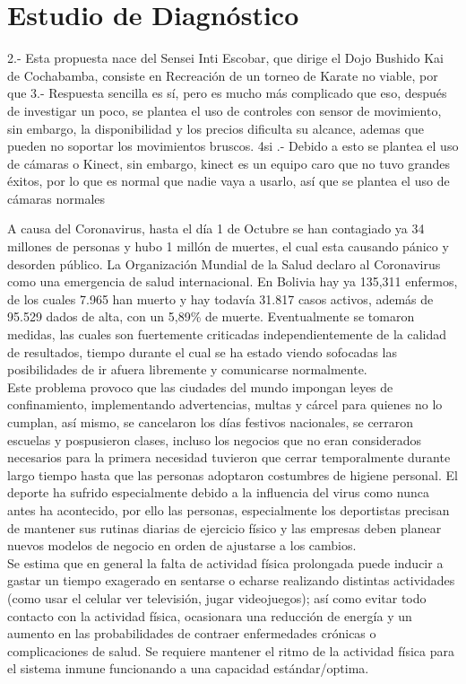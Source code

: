 \chapter{Estudio de Diagnóstico}

2.- Esta propuesta nace del Sensei Inti Escobar, que dirige el Dojo Bushido Kai de Cochabamba, consiste en  Recreación de un torneo de Karate no viable, por que
3.- Respuesta sencilla es sí, pero es mucho más complicado que eso, después de investigar un poco, se plantea el uso de controles con sensor de movimiento, sin embargo, la disponibilidad y los precios dificulta su alcance, ademas que pueden no soportar los movimientos bruscos.
4si .- Debido a esto se plantea el uso de cámaras o Kinect, sin embargo, kinect es un equipo caro que no tuvo grandes éxitos, por lo que es normal que nadie vaya a usarlo, así que se plantea el uso de cámaras normales




A causa del Coronavirus, hasta el día 1 de Octubre se han contagiado ya 34 millones de personas y hubo 1 millón de muertes, el cual esta causando pánico y desorden público. La Organización Mundial de la Salud declaro al Coronavirus como una emergencia de salud internacional. En Bolivia hay ya 135,311 enfermos, de los cuales 7.965 han muerto y hay todavía 31.817 casos activos, además de 95.529 dados de alta, con un 5,89\% de muerte. Eventualmente se tomaron medidas, las cuales son fuertemente criticadas independientemente de la calidad de resultados, tiempo durante el cual se ha estado viendo sofocadas las posibilidades de ir afuera libremente y comunicarse normalmente. \\

Este problema provoco que las ciudades del mundo impongan leyes de confinamiento, implementando advertencias, multas y cárcel para quienes no lo cumplan, así mismo, se cancelaron los días festivos nacionales, se cerraron escuelas y pospusieron clases, incluso los negocios que no eran considerados necesarios para la primera necesidad tuvieron que cerrar temporalmente durante largo tiempo hasta que las personas adoptaron  costumbres de higiene personal. El deporte ha sufrido especialmente debido a la influencia del virus como nunca antes ha acontecido, por ello las personas, especialmente los deportistas precisan de mantener sus rutinas diarias de ejercicio físico y las empresas deben planear nuevos modelos de negocio en orden de ajustarse a los cambios.\\

Se estima que en general la falta de actividad física prolongada puede inducir a gastar un tiempo exagerado en sentarse o echarse realizando distintas actividades (como usar el celular ver televisión, jugar videojuegos); así como evitar todo contacto con la actividad física, ocasionara una reducción de energía y  un aumento en las probabilidades de contraer enfermedades crónicas o complicaciones de salud. Se requiere mantener el ritmo de la actividad física para el sistema inmune funcionando a una capacidad estándar/optima.\\

